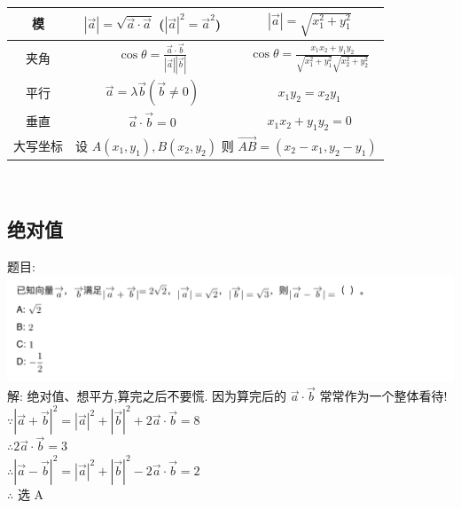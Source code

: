 \documentclass[hyperref, UTF8,11pt,a4paper]{ctexart} %
\begin{document}
{\begin{tabular}{|c|c|c|}
		\hline
		模                             & $|\vec{a} |=\sqrt{\vec{a}  \cdot \vec{a} }$ \qquad ($|\vec{a}|^{2}=\vec{a}^{2}$)                                                                  & $|\vec{a}|=\sqrt{x_{1}^{2}+y_{1}^{2}}$                                                              \\
		\hline
		夹角                           & $\cos \theta=\frac{\vec{a} \cdot \vec{b}}{|\vec{a}||\vec{b}|}$                                                                                    & $\cos \theta=\frac{x_{1} x_{2}+y_{1} y_{2}}{\sqrt{x_{1}^{2}+y_{1}^{2}} \sqrt{x_{2}^{2}+y_{2}^{2}}}$ \\
		\hline
		平行                           & $\vec{a}=\lambda \vec{b}(\vec{b} \neq 0)$                                                                                                         & $x_{1} y_{2}=x_{2} y_{1}$                                                                           \\
		\hline
		垂直                           & $\vec{a} \cdot \vec{b}=0$                                                                                                                         & $x_{1} x_{2}+y_{1} y_{2}=0$                                                                         \\
		\hline
		大写坐标                       & \multicolumn{2}{c}{ 设 $A\left(x_{1}, y_{1}\right), B\left(x_{2}, y_{2}\right)$ 则 $\overrightarrow{A B}=\left(x_{2}-x_{1}, y_{2}-y_{1}\right)$ }                                                                                                       \\
		\hline
	\end{tabular} \\
	\par}

\subsection{绝对值}
{\color{red}  题目: } \\
\includegraphics[width=500pt]  {pic/xiangliang/jueduizhi.jpg} \\
解: {\color{blue} 绝对值、想平方,算完之后不要慌. 因为算完后的 $\vec{a} \cdot \vec{b}$ 常常作为一个整体看待!}\\
$\because |\vec{a}+\vec{b}|^{2}=|\vec{a}|^{2}+|\vec{b}|^{2}+2 \vec{a} \cdot \vec{b}=8$ \\
$ \therefore 2 \vec{a} \cdot \vec{b}=3$ \\
$\therefore |\vec{a}-\vec{b}|^{2}=|\vec{a}|^{2}+|\vec{b}|^{2}-2 \vec{a} \cdot \vec{b}=2$ \\
$\therefore $ 选 A
\end{document}
